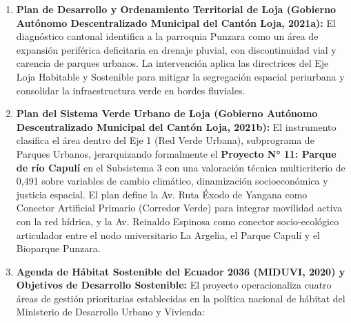 \documentclass[
  spanish,
  letterpaper,
  DIV=11,
  numbers=noendperiod]{scrartcl}
\begin{document}
\begin{enumerate}
\def\labelenumi{\arabic{enumi}.}
\item
  \textbf{Plan de Desarrollo y Ordenamiento Territorial de Loja
  (Gobierno Autónomo Descentralizado Municipal del Cantón Loja, 2021a):}
  El diagnóstico cantonal identifica a la parroquia Punzara como un área
  de expansión periférica deficitaria en drenaje pluvial, con
  discontinuidad vial y carencia de parques urbanos. La intervención
  aplica las directrices del Eje Loja Habitable y Sostenible para
  mitigar la segregación espacial periurbana y consolidar la
  infraestructura verde en bordes fluviales.
\item
  \textbf{Plan del Sistema Verde Urbano de Loja (Gobierno Autónomo
  Descentralizado Municipal del Cantón Loja, 2021b):} El instrumento
  clasifica el área dentro del Eje 1 (Red Verde Urbana), subprograma de
  Parques Urbanos, jerarquizando formalmente el \textbf{Proyecto N° 11:
  Parque de río Capulí} en el Subsistema 3 con una valoración técnica
  multicriterio de 0,491 sobre variables de cambio climático,
  dinamización socioeconómica y justicia espacial. El plan define la Av.
  Ruta Éxodo de Yangana como Conector Artificial Primario (Corredor
  Verde) para integrar movilidad activa con la red hídrica, y la Av.
  Reinaldo Espinosa como conector socio-ecológico articulador entre el
  nodo universitario La Argelia, el Parque Capulí y el Bioparque
  Punzara.
\item
  \textbf{Agenda de Hábitat Sostenible del Ecuador 2036 (MIDUVI, 2020) y
  Objetivos de Desarrollo Sostenible:} El proyecto operacionaliza cuatro
  áreas de gestión prioritarias establecidas en la política nacional de
  hábitat del Ministerio de Desarrollo Urbano y Vivienda:


\end{enumerate}
\end{document}
